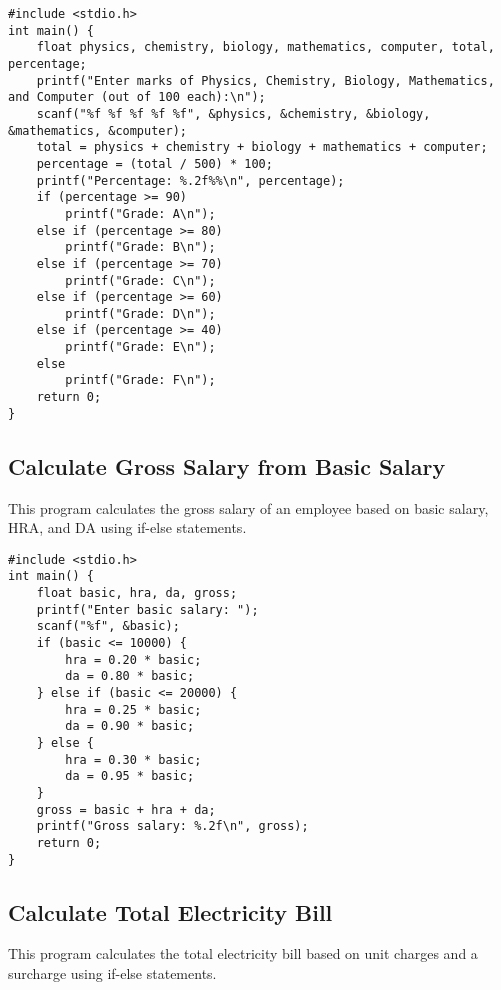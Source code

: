 \documentclass[a4paper,12pt]{article}
\begin{document}
\begin{lstlisting}[caption={Calculate Percentage and Grade from Marks}]
#include <stdio.h>
int main() {
    float physics, chemistry, biology, mathematics, computer, total, percentage;
    printf("Enter marks of Physics, Chemistry, Biology, Mathematics, and Computer (out of 100 each):\n");
    scanf("%f %f %f %f %f", &physics, &chemistry, &biology, &mathematics, &computer);
    total = physics + chemistry + biology + mathematics + computer;
    percentage = (total / 500) * 100;
    printf("Percentage: %.2f%%\n", percentage);
    if (percentage >= 90)
        printf("Grade: A\n");
    else if (percentage >= 80)
        printf("Grade: B\n");
    else if (percentage >= 70)
        printf("Grade: C\n");
    else if (percentage >= 60)
        printf("Grade: D\n");
    else if (percentage >= 40)
        printf("Grade: E\n");
    else
        printf("Grade: F\n");
    return 0;
}
\end{lstlisting}

\newpage

\subsection{Calculate Gross Salary from Basic Salary}
This program calculates the gross salary of an employee based on basic salary, HRA, and DA using if-else statements.

\begin{lstlisting}[caption={Calculate Gross Salary from Basic Salary}]
#include <stdio.h>
int main() {
    float basic, hra, da, gross;
    printf("Enter basic salary: ");
    scanf("%f", &basic);
    if (basic <= 10000) {
        hra = 0.20 * basic;
        da = 0.80 * basic;
    } else if (basic <= 20000) {
        hra = 0.25 * basic;
        da = 0.90 * basic;
    } else {
        hra = 0.30 * basic;
        da = 0.95 * basic;
    }
    gross = basic + hra + da;
    printf("Gross salary: %.2f\n", gross);
    return 0;
}
\end{lstlisting}

\newpage

\subsection{Calculate Total Electricity Bill}
This program calculates the total electricity bill based on unit charges and a surcharge using if-else statements.
\end{document}
